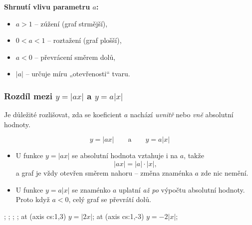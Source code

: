 \documentclass[12pt,a4paper]{article}
\begin{document}
\begin{notebox}
\textbf{Shrnutí vlivu parametru $a$:}
\begin{itemize}
    \item $a > 1$ – zúžení (graf strmější),
    \item $0 < a < 1$ – roztažení (graf plošší),
    \item $a < 0$ – převrácení směrem dolů,
    \item $|a|$ – určuje míru „otevřenosti“ tvaru.
\end{itemize}
\end{notebox}

\subsubsection*{Rozdíl mezi $y = |a x|$ a $y = a |x|$}

Je důležité rozlišovat, zda se koeficient $a$ nachází \textit{uvnitř} nebo \textit{vně} absolutní hodnoty.

\[
y = |a x| \qquad \text{a} \qquad y = a|x|
\]

\begin{itemize}
  \item U funkce $y = |a x|$ se absolutní hodnota vztahuje i na $a$, takže
  \[
  |a x| = |a| \cdot |x|,
  \]
  a graf je vždy otevřen směrem nahoru – změna znaménka $a$ zde nic nemění.
  
  \item U funkce $y = a|x|$ se znaménko $a$ uplatní \textit{až po} výpočtu absolutní hodnoty.  
  Proto když $a < 0$, celý graf se převrátí dolů.
\end{itemize}

\begin{center}
\begin{axisgraph}[
    xmin=-4, xmax=4,
    ymin=-4, ymax=4,
    axis lines=middle,
    xlabel={$x$}, ylabel={$y$},
    title={Rozdíl mezi $|a x|$ a $a|x|$},
    width=0.8\linewidth,
    height=6cm,
    samples=100
]
    ;
    ;
    ;
    ;
     at (axis cs:1,3) {$y=|2x|$};
     at (axis cs:1,-3) {$y=-2|x|$};
\end{axisgraph}
\end{center}
\end{document}
